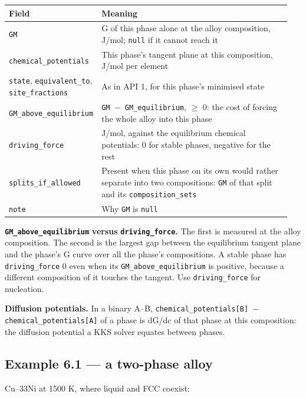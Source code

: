 \documentclass[12pt,a4paper]{article}
\begin{document}
\begingroup\small
\begin{longtable}{>{\raggedright\arraybackslash}p{0.243\linewidth}>{\raggedright\arraybackslash}p{0.704\linewidth}}
\toprule
\textbf{Field} & \textbf{Meaning} \\
\midrule
\endhead
\texttt{GM} & G of this phase alone at the alloy composition, J/mol; \texttt{null} if it cannot reach it \\
\texttt{chemical\_\allowbreak{}potentials} & This phase's tangent plane at this composition, J/mol per element \\
\texttt{state}, \texttt{equivalent\_\allowbreak{}to}, \texttt{site\_\allowbreak{}fractions} & As in API 1, for this phase's minimised state \\
\texttt{GM\_\allowbreak{}above\_\allowbreak{}equilibrium} & \texttt{GM \(-\) GM\_\allowbreak{}equilibrium}, \(\ge\) 0: the cost of forcing the whole alloy into this phase \\
\texttt{driving\_\allowbreak{}force} & J/mol, against the equilibrium chemical potentials: 0 for stable phases, negative for the rest \\
\texttt{splits\_\allowbreak{}if\_\allowbreak{}allowed} & Present when this phase on its own would rather separate into two compositions: \texttt{GM} of that split and its \texttt{composition\_\allowbreak{}sets} \\
\texttt{note} & Why \texttt{GM} is \texttt{null} \\
\bottomrule
\end{longtable}
\endgroup
\textbf{\texttt{GM\_\allowbreak{}above\_\allowbreak{}equilibrium}}\textbf{ versus }\textbf{\texttt{driving\_\allowbreak{}force}}\textbf{.} The first is measured at the alloy composition. The second is the largest gap between the equilibrium tangent plane and the phase's G curve over all the phase's compositions. A stable phase has \texttt{driving\_\allowbreak{}force} 0 even when its \texttt{GM\_\allowbreak{}above\_\allowbreak{}equilibrium} is positive, because a different composition of it touches the tangent. Use \texttt{driving\_\allowbreak{}force} for nucleation.

\textbf{Diffusion potentials.} In a binary A--B, \texttt{chemical\_\allowbreak{}potentials[B] \(-\) chemical\_\allowbreak{}potentials[A]} of a phase is dG/dc of that phase at this composition: the diffusion potential a KKS solver equates between phases.


\subsection*{Example 6.1 --- a two-phase alloy}
Cu--33Ni at 1500 K, where liquid and FCC coexist:
\end{document}
